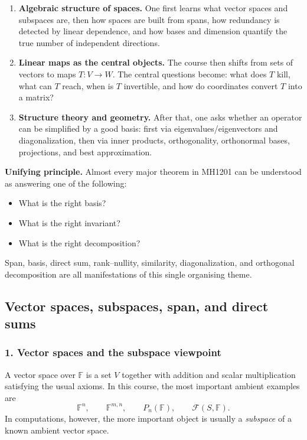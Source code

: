 \begin{enumerate}[label=\textbf{Stage \arabic*:}, leftmargin=*]
    \item \textbf{Algebraic structure of spaces.}  
    One first learns what vector spaces and subspaces are, then how spaces are built from spans, how redundancy is detected by linear dependence, and how bases and dimension quantify the true number of independent directions.

    \item \textbf{Linear maps as the central objects.}  
    The course then shifts from sets of vectors to maps \(T:V\to W\). The central questions become: what does \(T\) kill, what can \(T\) reach, when is \(T\) invertible, and how do coordinates convert \(T\) into a matrix?

    \item \textbf{Structure theory and geometry.}  
    After that, one asks whether an operator can be simplified by a good basis: first via eigenvalues/eigenvectors and diagonalization, then via inner products, orthogonality, orthonormal bases, projections, and best approximation.
\end{enumerate}

\begin{policynote}
\textbf{Unifying principle.}
Almost every major theorem in MH1201 can be understood as answering one of the following:
\begin{itemize}[leftmargin=*]
    \item What is the right basis?
    \item What is the right invariant?
    \item What is the right decomposition?
\end{itemize}
Span, basis, direct sum, rank--nullity, similarity, diagonalization, and orthogonal decomposition are all manifestations of this single organising theme.
\end{policynote}

\subsection{Vector spaces, subspaces, span, and direct sums}

\subsubsection*{1. Vector spaces and the subspace viewpoint}

A vector space over \(\mathbb{F}\) is a set \(V\) together with addition and scalar multiplication satisfying the usual axioms. In this course, the most important ambient examples are
\[
\mathbb{F}^n,\qquad \mathbb{F}^{m,n},\qquad P_n(\mathbb{F}),\qquad \mathcal{F}(S,\mathbb{F}).
\]
In computations, however, the more important object is usually a \emph{subspace} of a known ambient vector space.

